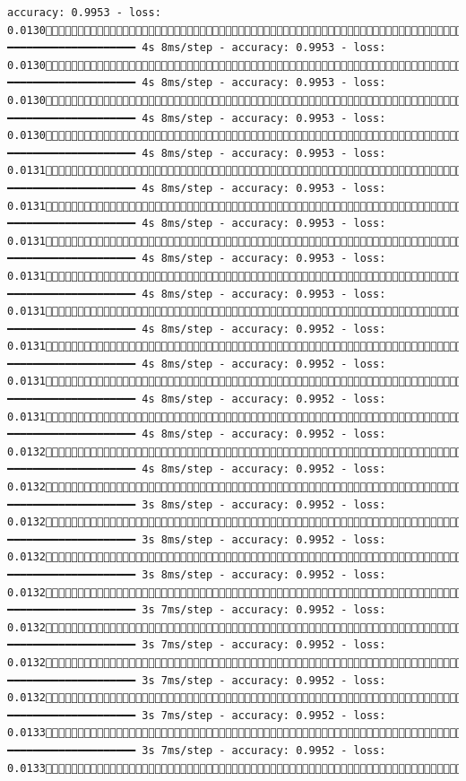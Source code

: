 \documentclass[
  letterpaper,
  DIV=11,
  numbers=noendperiod]{scrreprt}
\begin{document}
\begin{verbatim}
accuracy: 0.9953 - loss: 0.01301252/1875 ━━━━━━━━━━━━━━━━━━━━ 4s 8ms/step - accuracy: 0.9953 - loss: 0.01301260/1875 ━━━━━━━━━━━━━━━━━━━━ 4s 8ms/step - accuracy: 0.9953 - loss: 0.01301267/1875 ━━━━━━━━━━━━━━━━━━━━ 4s 8ms/step - accuracy: 0.9953 - loss: 0.01301274/1875 ━━━━━━━━━━━━━━━━━━━━ 4s 8ms/step - accuracy: 0.9953 - loss: 0.01311282/1875 ━━━━━━━━━━━━━━━━━━━━ 4s 8ms/step - accuracy: 0.9953 - loss: 0.01311290/1875 ━━━━━━━━━━━━━━━━━━━━ 4s 8ms/step - accuracy: 0.9953 - loss: 0.01311298/1875 ━━━━━━━━━━━━━━━━━━━━ 4s 8ms/step - accuracy: 0.9953 - loss: 0.01311305/1875 ━━━━━━━━━━━━━━━━━━━━ 4s 8ms/step - accuracy: 0.9953 - loss: 0.01311313/1875 ━━━━━━━━━━━━━━━━━━━━ 4s 8ms/step - accuracy: 0.9952 - loss: 0.01311320/1875 ━━━━━━━━━━━━━━━━━━━━ 4s 8ms/step - accuracy: 0.9952 - loss: 0.01311328/1875 ━━━━━━━━━━━━━━━━━━━━ 4s 8ms/step - accuracy: 0.9952 - loss: 0.01311335/1875 ━━━━━━━━━━━━━━━━━━━━ 4s 8ms/step - accuracy: 0.9952 - loss: 0.01321342/1875 ━━━━━━━━━━━━━━━━━━━━ 4s 8ms/step - accuracy: 0.9952 - loss: 0.01321349/1875 ━━━━━━━━━━━━━━━━━━━━ 3s 8ms/step - accuracy: 0.9952 - loss: 0.01321356/1875 ━━━━━━━━━━━━━━━━━━━━ 3s 8ms/step - accuracy: 0.9952 - loss: 0.01321364/1875 ━━━━━━━━━━━━━━━━━━━━ 3s 8ms/step - accuracy: 0.9952 - loss: 0.01321372/1875 ━━━━━━━━━━━━━━━━━━━━ 3s 7ms/step - accuracy: 0.9952 - loss: 0.01321380/1875 ━━━━━━━━━━━━━━━━━━━━ 3s 7ms/step - accuracy: 0.9952 - loss: 0.01321388/1875 ━━━━━━━━━━━━━━━━━━━━ 3s 7ms/step - accuracy: 0.9952 - loss: 0.01321395/1875 ━━━━━━━━━━━━━━━━━━━━ 3s 7ms/step - accuracy: 0.9952 - loss: 0.01331403/1875 ━━━━━━━━━━━━━━━━━━━━ 3s 7ms/step - accuracy: 0.9952 - loss: 0.01331411/1875 
\end{verbatim}
\end{document}
